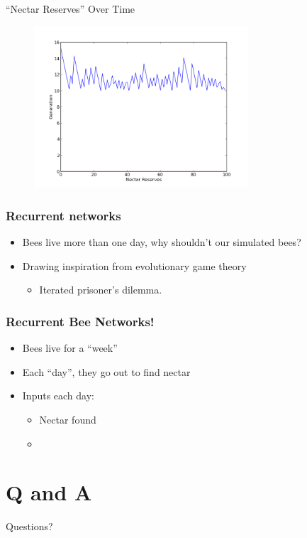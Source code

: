 \documentclass{beamer}
\begin{document}
    \begin{frame}{``Nectar Reserves'' Over Time}
        \begin{figure}
        \includegraphics[width=8cm]{hive_influenced_bees_nectar.png}
        \end{figure}
    \end{frame}

    \begin{frame}[t]\frametitle{Recurrent networks}
        
        \begin{itemize}
            \item Bees live more than one day, why shouldn't our simulated bees?
            \item Drawing inspiration from evolutionary game theory
            \begin{itemize}
                \item Iterated prisoner's dilemma.
            \end{itemize}
        \end{itemize}
    
    \end{frame}

    \begin{frame}[t]\frametitle{Recurrent Bee Networks!}
        
        \begin{itemize}
            \item Bees live for a ``week''
            \item Each ``day'', they go out to find nectar
            \bigskip
            \item Inputs each day:
            \begin{itemize}
                \item Nectar found
                \item 
            \end{itemize}
        \end{itemize}
    
    \end{frame}


    \section{Q and A}
    \begin{frame}{Questions?}
        \titlepage
    \end{frame}
\end{document}
